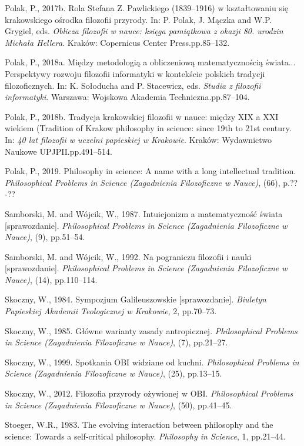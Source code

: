 \documentclass[a4paper]{article}
\begin{document}
Polak, P., 2017b. Rola Stefana Z. Pawlickiego (1839–1916) w kształtowaniu się krakowskiego ośrodka filozofii przyrody.
In: P. Polak, J. Mączka and W.P. Grygiel, eds. \textit{Oblicza filozofii w nauce: księga pamiątkowa z okazji 80.
urodzin Michała Hellera}. Kraków: Copernicus Center Press.pp.85–132.

Polak, P., 2018a. Między metodologią a obliczeniową matematycznością świata... Perspektywy rozwoju filozofii informatyki
w kontekście polskich tradycji filozoficznych. In: K. Sołoducha and P. Stacewicz, eds. \textit{Studia z filozofii
informatyki}. Warszawa: Wojskowa Akademia Techniczna.pp.87–104.

Polak, P., 2018b. Tradycja krakowskiej filozofii w nauce: między XIX a XXI wiekiem (Tradition of Krakow philosophy in
science: since 19th to 21st century. In: \textit{40 lat filozofii w uczelni papieskiej w Krakowie}. Kraków: Wydawnictwo
Naukowe UPJPII.pp.491–514.

Polak, P., 2019. Philosophy in science: A name with a long intellectual tradition. \textit{Philosophical Problems in
Science (Zagadnienia Filozoficzne w Nauce)}, (66), p.??-??

Samborski, M. and Wójcik, W., 1987. Intuicjonizm a matematyczność świata [sprawozdanie]. \textit{Philosophical Problems
in Science (Zagadnienia Filozoficzne w Nauce)}, (9), pp.51–54.

Samborski, M. and Wójcik, W., 1992. Na pograniczu filozofii i nauki [sprawozdanie]. \textit{Philosophical Problems in
Science (Zagadnienia Filozoficzne w Nauce)}, (14), pp.110–114.

Skoczny, W., 1984. Sympozjum Galileuszowskie [sprawozdanie]. \textit{Biuletyn Papieskiej Akademii Teologicznej w
Krakowie}, 2, pp.70–73.

Skoczny, W., 1985. Główne warianty zasady antropicznej. \textit{Philosophical Problems in Science (Zagadnienia
Filozoficzne w Nauce)}, (7), pp.21–27.

Skoczny, W., 1999. Spotkania OBI widziane od kuchni. \textit{Philosophical Problems in Science (Zagadnienia Filozoficzne
w Nauce)}, (25), pp.13–15.

Skoczny, W., 2012. Filozofia przyrody ożywionej w OBI. \textit{Philosophical Problems in Science (Zagadnienia
Filozoficzne w Nauce)}, (50), pp.41–45.

Stoeger, W.R., 1983. The evolving interaction between philosophy and the science: Towards a self-critical philosophy.
\textit{Philosophy in Science}, 1, pp.21–44.
\end{document}
